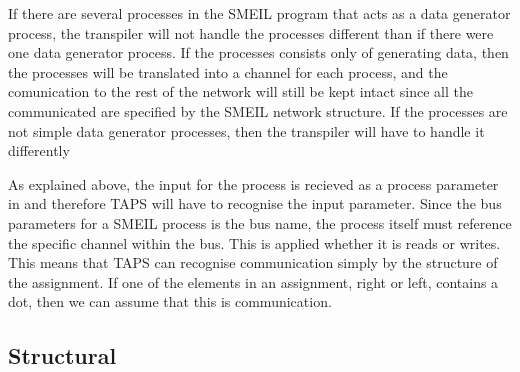If there are several processes in the SMEIL program that acts as a data generator process, the transpiler will not handle the processes different than if there were one data generator process. If the processes consists only of generating data, then the processes will be translated into a \cspm channel for each process, and the comunication to the rest of the network will still be kept intact since all the communicated are specified by the SMEIL network structure.
If the processes are not simple data generator processes, then the transpiler will have to handle it differently %






As explained above, the input for the process is recieved as a process parameter in \cspm{} and therefore TAPS will have to recognise the input parameter. Since the bus parameters for a SMEIL process is the bus name, the process itself must reference the specific channel within the bus. This is applied whether it is reads or writes.
This means that TAPS can recognise communication simply by the structure of the assignment. If one of the elements in an assignment, right or left, contains a dot, then we can assume that this is communication.






\subsection{Structural}



